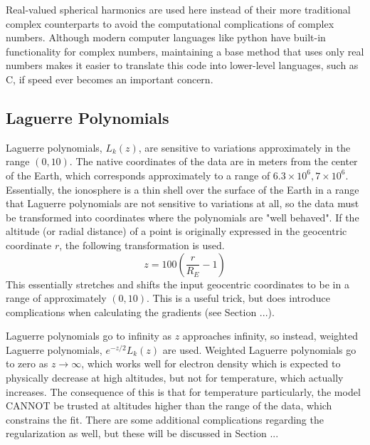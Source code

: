 \documentclass[12pt,letterpaper]{article}
\begin{document}
  Real-valued spherical harmonics are used here instead of their more traditional complex counterparts to avoid the computational complications of complex numbers.  Although modern computer languages like python have built-in functionality for complex numbers, maintaining a base method that uses only real numbers makes it easier to translate this code into lower-level languages, such as C, if speed ever becomes an important concern.

  \subsection{Laguerre Polynomials}
  \label{sec:laguerre}
  Laguerre polynomials, \(L_k(z)\), are sensitive to variations approximately in the range \((0,10)\).  The native coordinates of the data are in meters from the center of the Earth, which corresponds approximately to a range of \(6.3\times10^6,7\times10^6\).  Essentially, the ionosphere is a thin shell over the surface of the Earth in a range that Laguerre polynomials are not sensitive to variations at all, so the data must be transformed into coordinates where the polynomials are "well behaved".  If the altitude (or radial distance) of a point is originally expressed in the geocentric coordinate \(r\), the following transformation is used.
  \begin{equation}
    \label{eqn:rtransform}
    z = 100\left(\frac{r}{R_E}-1\right)
  \end{equation}
  This essentially stretches and shifts the input geocentric coordinates to be in a range of approximately \((0,10)\).  This is a useful trick, but does introduce complications when calculating the gradients (see Section ...).

  Laguerre polynomials go to infinity as \(z\) approaches infinity, so instead, weighted Laguerre polynomials, \(e^{-z/2}L_k(z)\) are used.  Weighted Laguerre polynomials go to zero as \(z\rightarrow\infty\), which works well for electron density which is expected to physically decrease at high altitudes, but not for temperature, which actually increases.  The consequence of this is that for temperature particularly, the model CANNOT be trusted at altitudes higher than the range of the data, which constrains the fit.  There are some additional complications regarding the regularization as well, but these will be discussed in Section ...
\end{document}
